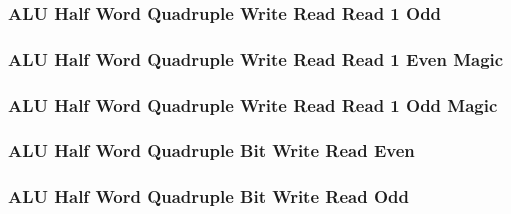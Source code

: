 

\subsubsection[{\small ALU Half Word Quadruple Write Read Read 1 Odd}]{ALU Half Word Quadruple Write Read Read 1 Odd} \label{sec:format-ALU-HQWRR1O}



\subsubsection[{\small ALU Half Word Quadruple Write Read Read 1 Even Magic}]{ALU Half Word Quadruple Write Read Read 1 Even Magic} \label{sec:format-ALU-HQWRR1E.M}



\subsubsection[{\small ALU Half Word Quadruple Write Read Read 1 Odd Magic}]{ALU Half Word Quadruple Write Read Read 1 Odd Magic} \label{sec:format-ALU-HQWRR1O.M}



\subsubsection[{\small ALU Half Word Quadruple Bit Write Read Even}]{ALU Half Word Quadruple Bit Write Read Even} \label{sec:format-ALU-HQBWRE}



\subsubsection[{\small ALU Half Word Quadruple Bit Write Read Odd}]{ALU Half Word Quadruple Bit Write Read Odd} \label{sec:format-ALU-HQBWRO}

